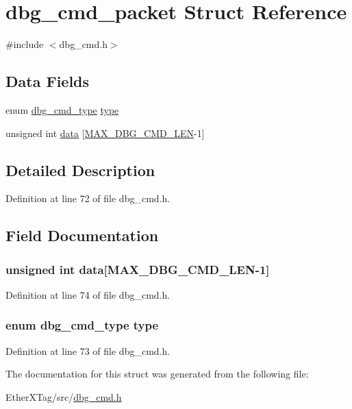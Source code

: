 \hypertarget{structdbg__cmd__packet}{\section{dbg\-\_\-cmd\-\_\-packet Struct Reference}
\label{structdbg__cmd__packet}
}


{\ttfamily \#include $<$dbg\-\_\-cmd.\-h$>$}

\subsection*{Data Fields}
\begin{DoxyCompactItemize}
\item 
enum \hyperlink{dbg__cmd_8h_a921a01d6be6d3bf1d52a1713a55b186d}{dbg\-\_\-cmd\-\_\-type} \hyperlink{structdbg__cmd__packet_a1e4ce97c93b772bbbacf726804cb1dd1}{type}
\item 
unsigned int \hyperlink{structdbg__cmd__packet_a3e301c82072246baef805fc5c0e3fd9a}{data} \mbox{[}\hyperlink{dbg__cmd_8h_abe6cfb003699e267c6bb15e549e269a4}{M\-A\-X\-\_\-\-D\-B\-G\-\_\-\-C\-M\-D\-\_\-\-L\-E\-N}-\/1\mbox{]}
\end{DoxyCompactItemize}


\subsection{Detailed Description}


Definition at line 72 of file dbg\-\_\-cmd.\-h.



\subsection{Field Documentation}
\hypertarget{structdbg__cmd__packet_a3e301c82072246baef805fc5c0e3fd9a}{
\subsubsection[{data}]{\setlength{\rightskip}{0pt plus 5cm}unsigned int data\mbox{[}{\bf M\-A\-X\-\_\-\-D\-B\-G\-\_\-\-C\-M\-D\-\_\-\-L\-E\-N}-\/1\mbox{]}}}\label{structdbg__cmd__packet_a3e301c82072246baef805fc5c0e3fd9a}


Definition at line 74 of file dbg\-\_\-cmd.\-h.

\hypertarget{structdbg__cmd__packet_a1e4ce97c93b772bbbacf726804cb1dd1}{
\subsubsection[{type}]{\setlength{\rightskip}{0pt plus 5cm}enum {\bf dbg\-\_\-cmd\-\_\-type} type}}\label{structdbg__cmd__packet_a1e4ce97c93b772bbbacf726804cb1dd1}


Definition at line 73 of file dbg\-\_\-cmd.\-h.



The documentation for this struct was generated from the following file\-:\begin{DoxyCompactItemize}
\item 
Ether\-X\-Tag/src/\hyperlink{dbg__cmd_8h}{dbg\-\_\-cmd.\-h}\end{DoxyCompactItemize}
